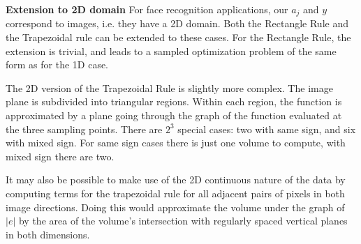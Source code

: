 \documentclass[12pt,journal,draftcls,letterpaper,onecolumn]{IEEEtran}
\begin{document}



{\bf Extension to 2D domain} For face recognition applications, our $a_j$ and $y$ correspond to images, i.e. they have a 2D domain.  Both the Rectangle Rule and the Trapezoidal rule can be extended to these cases.  For the Rectangle Rule, the extension is trivial, and leads to a sampled optimization problem of the same form as for the 1D case.  

The 2D version of the Trapezoidal Rule is slightly more complex.  The image plane is subdivided into triangular regions.  Within each region, the function is approximated by a plane going through the graph of the function evaluated at the three sampling points.  There are $2^3$ special cases: two with same sign, and six with mixed sign.  For same sign cases there is just one volume to compute, with mixed sign there are two.  

It may also be possible to make use of the 2D continuous nature of the data by computing terms for the trapezoidal rule for all adjacent pairs of pixels in both image directions.  Doing this would approximate the volume under the graph of $|e|$ by the area of the volume's intersection with regularly spaced vertical planes in both dimensions.  
\end{document}
